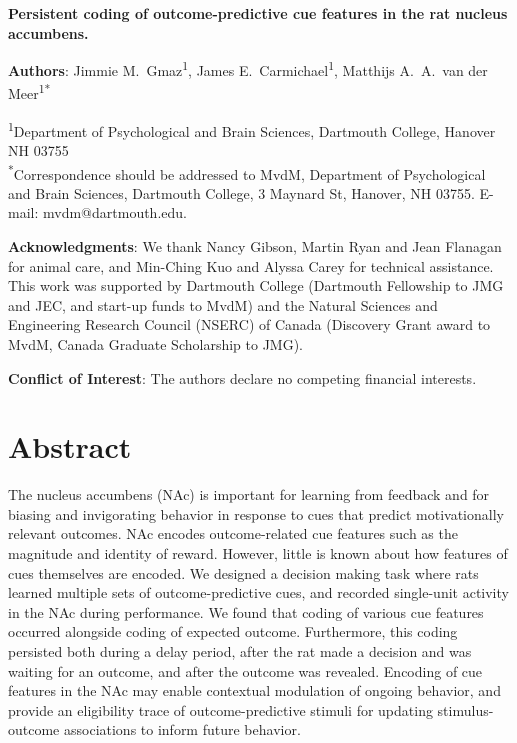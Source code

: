 \documentclass[11pt]{article}
\providecommand{\DIFadd}[1]{{\protect\color{red} \sf #1}} %
\providecommand{\DIFdel}[1]{} %
\providecommand{\DIFaddbegin}{} %
\providecommand{\DIFaddend}{} %
\providecommand{\DIFdelbegin}{} %
\providecommand{\DIFdelend}{} %
\newcommand{\DIFscaledelfig}{0.5}
\newlength{\DIFdelgraphicswidth} %
\newlength{\DIFdelgraphicsheight} %
\newcommand{\DIFaddincludegraphics}[2][]{{\color{red}\fbox{\DIFOincludegraphics[#1]{#2}}}} %
\newcommand{\DIFdelincludegraphics}[2][]{%
\sbox{\DIFdelgraphicsbox}{\DIFOincludegraphics[#1]{#2}}%
\settoboxwidth{\DIFdelgraphicswidth}{\DIFdelgraphicsbox} %
\settoboxtotalheight{\DIFdelgraphicsheight}{\DIFdelgraphicsbox} %
\scalebox{\DIFscaledelfig}{%
\parbox[b]{\DIFdelgraphicswidth}{\usebox{\DIFdelgraphicsbox}\\[-\baselineskip] \rule{\DIFdelgraphicswidth}{0em}}\llap{\resizebox{\DIFdelgraphicswidth}{\DIFdelgraphicsheight}{%
\setlength{\unitlength}{\DIFdelgraphicswidth}%
\begin{picture}(1,1)%
\thicklines\linethickness{2pt} %
{\color[rgb]{1,0,0}\put(0,0){\framebox(1,1){}}}%
{\color[rgb]{1,0,0}\put(0,0){\line( 1,1){1}}}%
{\color[rgb]{1,0,0}\put(0,1){\line(1,-1){1}}}%
\end{picture}%
}\hspace*{3pt}}} %
} %
\DeclareRobustCommand{\DIFaddbegin}{\DIFOaddbegin \let\includegraphics\DIFaddincludegraphics} %
\DeclareRobustCommand{\DIFaddend}{\DIFOaddend \let\includegraphics\DIFOincludegraphics} %
\DeclareRobustCommand{\DIFdelbegin}{\DIFOdelbegin \let\includegraphics\DIFdelincludegraphics} %
\DeclareRobustCommand{\DIFdelend}{\DIFOaddend \let\includegraphics\DIFOincludegraphics} %
\begin{document}
\renewcommand{\BBAB}{\BBAA}

{\Large\bf Persistent coding of outcome-predictive cue features in the
  rat nucleus accumbens.}

{\bf Authors}: Jimmie M.\ Gmaz\textsuperscript{1}, James
E.\ Carmichael\textsuperscript{1}, Matthijs A.\ A.\ van der
Meer\textsuperscript{1*}

\textsuperscript{1}Department of Psychological and Brain Sciences,
Dartmouth College, Hanover NH
03755\\ 

\textsuperscript{*}Correspondence should be addressed to MvdM,
Department of Psychological and Brain Sciences, Dartmouth College, 3
Maynard St, Hanover, NH 03755. E-mail: {\sffamily mvdm@dartmouth.edu}.

\textbf{Acknowledgments}: We thank Nancy Gibson, Martin Ryan and Jean
Flanagan for animal care, and Min-Ching Kuo and
Alyssa Carey for technical assistance. This work was supported by
Dartmouth College (Dartmouth Fellowship to JMG and JEC, and start-up funds to
MvdM) and the Natural Sciences and Engineering Research Council
(NSERC) of Canada (Discovery Grant award to MvdM, Canada Graduate
Scholarship to JMG).

\textbf{Conflict of Interest}: The authors declare no competing
financial interests.\\

\newpage
\linenumbers

\section*{Abstract}

The nucleus accumbens (NAc) \DIFdelbegin \DIFdel{has been shown to be }\DIFdelend \DIFaddbegin \DIFadd{is }\DIFaddend important for learning from feedback
\DIFdelbegin \DIFdel{, and }\DIFdelend \DIFaddbegin \DIFadd{and for }\DIFaddend biasing and invigorating behavior in response to \DIFdelbegin \DIFdel{outcome-predictive cues }\DIFdelend \DIFaddbegin \DIFadd{cues that
predict motivationally relevant outcomes}\DIFaddend . NAc encodes outcome-related
cue features such as the magnitude and identity of reward. However,
\DIFdelbegin \DIFdel{not
much }\DIFdelend \DIFaddbegin \DIFadd{little }\DIFaddend is known about how features of cues themselves are encoded.
We designed a decision making task where rats learned multiple sets of
outcome-predictive cues, and recorded single-unit activity in the NAc
during performance. We found that coding of various cue features
occurred alongside coding of expected outcome. Furthermore, this
coding persisted both during a delay period, after the rat made a
decision and was waiting for an outcome, and after the outcome was
revealed. Encoding of cue features in the NAc may enable contextual
modulation of ongoing behavior, and provide an eligibility trace of
outcome-predictive stimuli for updating stimulus-outcome associations
to inform future behavior.
\end{document}
